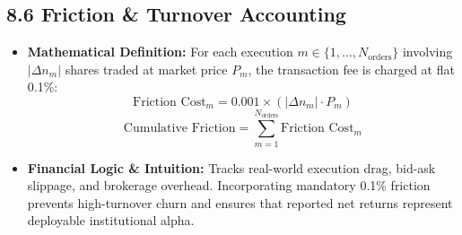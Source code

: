 \documentclass[11pt,a4paper]{article}
\begin{document}
\subsection{8.6 Friction \& Turnover Accounting}
\begin{itemize}[leftmargin=1.5em]
    \item \textbf{Mathematical Definition:} For each execution $m \in \{1, \dots, N_{\text{orders}}\}$ involving $|\Delta n_m|$ shares traded at market price $P_{m}$, the transaction fee is charged at flat 0.1\%:
    \begin{equation}
        \text{Friction Cost}_m = 0.001 \times (|\Delta n_m| \cdot P_{m})
    \end{equation}
    \begin{equation}
        \text{Cumulative Friction} = \sum_{m=1}^{N_{\text{orders}}} \text{Friction Cost}_m
    \end{equation}
    \item \textbf{Financial Logic \& Intuition:} Tracks real-world execution drag, bid-ask slippage, and brokerage overhead. Incorporating mandatory 0.1\% friction prevents high-turnover churn and ensures that reported net returns represent deployable institutional alpha.
\end{itemize}
\end{document}
